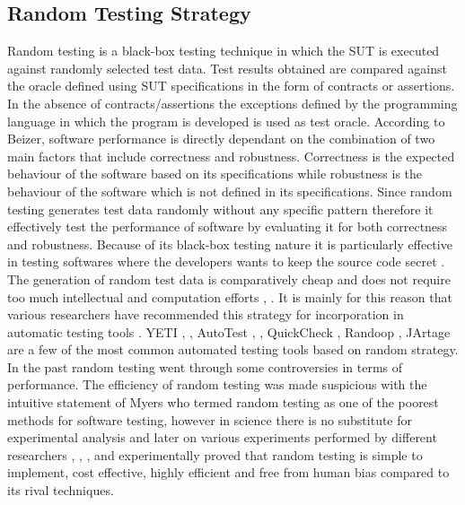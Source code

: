 \documentclass[conference]{IEEEtran}
\begin{document}
\subsection{Random Testing Strategy}
Random testing is a black-box testing technique in which the SUT is executed against randomly selected test data. Test results obtained are compared against the oracle defined using SUT specifications in the form of contracts or assertions. In the absence of contracts/assertions the exceptions defined by the programming language in which the program is developed is used as test oracle. According to Beizer, \cite{Beizer1990} software performance is directly dependant on the combination of two main factors that include correctness and robustness. Correctness is the expected behaviour of the software based on its specifications while robustness is the behaviour of the software which is not defined in its specifications. Since random testing generates test data randomly without any specific pattern therefore it effectively test the performance of software by evaluating it for both correctness and robustness. Because of its black-box testing nature it is particularly effective in testing softwares where the developers wants to keep the source code secret \cite{Chen2010}. The generation of random test data is comparatively cheap and does not require too much intellectual and computation efforts \cite{Ciupa2009}, \cite{Ciupa2008}. It is mainly for this reason that various researchers have recommended this strategy for incorporation in automatic testing tools \cite{Ciupa2008a}. YETI \cite{Oriol2010a}, \cite{Oriol2010}, AutoTest \cite{Leitner2007}, \cite{Ciupa2007}, QuickCheck \cite{Claessen2000}, Randoop \cite{Pacheco2007}, JArtage \cite{Oriat2004} are a few of the most common automated testing tools based on random strategy.\\
\indent In the past random testing went through some controversies in terms of performance. The efficiency of random testing was made suspicious with the intuitive statement of Myers \cite{Myers2004} who termed random testing as one of the poorest methods for software testing, however in science there is no substitute for experimental analysis and later on various experiments performed by different researchers \cite{Ciupa2007}, \cite{Duran1981}, \cite{Duran1984}, \cite{Hamlet1994} and \cite{Ntafos2001}  experimentally proved that random testing is simple to implement, cost effective, highly efficient and free from human bias compared to its rival techniques. 
\end{document}
